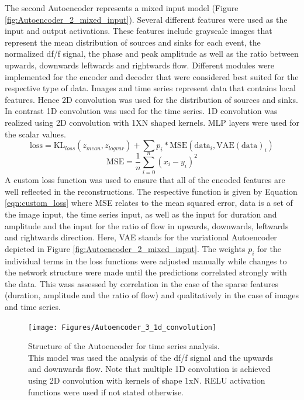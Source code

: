 The second Autoencoder represents a mixed input model (Figure \ref{fig:Autoencoder_2_mixed_input}). Several different features were used as the input and output activations. These features include grayscale images that represent the mean distribution of sources and sinks for each event, the normalized df/f signal, the phase and peak amplitude as well as the ratio between upwards, downwards leftwards and rightwards flow. Different modules were implemented for the encoder and decoder that were considered best suited for the respective type of data. Images and time series represent data that contains local features. Hence 2D convolution was used for the distribution of sources and sinks. In contrast 1D convolution was used for the time series. 1D convolution was realized using 2D convolution with 1XN shaped kernels. MLP layers were used for the scalar values. \\
\begin{equation}
\text{loss} = \text{KL}_{loss}(z_{mean},z_{logvar}) + \sum p_i * \text{MSE}(\text{data}_i, \text{VAE}(\text{data})_i)
\label{eqn:custom_loss}
\end{equation}
\begin{equation}
\text{MSE}=\frac{1}{n} \sum_{i=0}^n (x_{i}-y_{i})^2
\label{eqn:mse}
\end{equation}
A custom loss function was used to ensure that all of the encoded features are well reflected in the reconstructions. The respective function is given by Equation \ref{eqn:custom_loss} where MSE relates to the mean squared error, data is a set of the image input, the time series input, as well as the input for duration and amplitude and the input for the ratio of flow in upwards, downwards, leftwards and rightwards direction. Here, VAE stands for the variational Autoencoder depicted in Figure \ref{fig:Autoencoder_2_mixed_input}. The weights $p_i$ for the individual terms in the loss functions were adjusted manually while changes to the network structure were made until the predictions correlated strongly with the data. This wass assessed by correlation in the case of the sparse features (duration, amplitude and the ratio of flow) and qualitatively in the case of images and time series.\\
\begin{figure}[!htb]
\centering
\texttt{[image: Figures/Autoencoder\_3\_1d\_convolution]}
\decoRule
\caption[Structure of the Autoencoder for time series analysis]{Structure of the Autoencoder for time series analysis.\\ This model was used the analysis of the df/f signal and the upwards and downwards flow. Note that multiple 1D convolution is achieved using 2D convolution with kernels of shape 1xN. RELU activation functions were used if not stated otherwise.}
\label{fig:Autoencoder_3_1d_convolution}
\end{figure}
